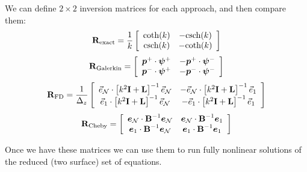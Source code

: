 \documentclass[10pt]{article}
\newcommand{\sN}{\mathcal{N}}
\newcommand{\mat}[1]{\text{\bf #1}}
\begin{document}
We can define $2\times2$ inversion matrices for each approach, and then compare them:
\[\mat{R}_{\text{exact}} = \frac{1}{k}\left[\begin{array}{cc}
\text{coth}(k)&-\text{csch}(k)\\
\text{csch}(k)&-\text{coth}(k)
\end{array}\right]\]
\[\mat{R}_{\text{Galerkin}} =\left[\begin{array}{cc}
\bm{p}^+\cdot\bm{\psi}^+&-\bm{p}^+\cdot\bm{\psi}^-\\
\bm{p}^-\cdot\bm{\psi}^+&-\bm{p}^-\cdot\bm{\psi}^-
\end{array}\right]\]
\[\mat{R}_{\text{FD}} = \frac{1}{\Delta_z}\left[\begin{array}{cc}
\vec{e}_\sN\cdot\left[k^2\mat{I}+\mat{L}\right]^{-1}\vec{e}_{\sN}&-\vec{e}_\sN\cdot\left[k^2\mat{I}+\mat{L}\right]^{-1}\vec{e}_{1}\\
\vec{e}_1\cdot\left[k^2\mat{I}+\mat{L}\right]^{-1}\vec{e}_{\sN}&-\vec{e}_1\cdot\left[k^2\mat{I}+\mat{L}\right]^{-1}\vec{e}_{1}
\end{array}\right]\]
\[\mat{R}_{\text{Cheby}} = \left[\begin{array}{cc}
\bm{e}_\sN\cdot\mat{B}^{-1}\bm{e}_\sN&\bm{e}_\sN\cdot\mat{B}^{-1}\bm{e}_1\\
\bm{e}_1\cdot\mat{B}^{-1}\bm{e}_\sN&\bm{e}_1\cdot\mat{B}^{-1}\bm{e}_1
\end{array}\right]\]

Once we have these matrices we can use them to run fully nonlinear solutions of the reduced (two surface) set of equations.
\end{document}

